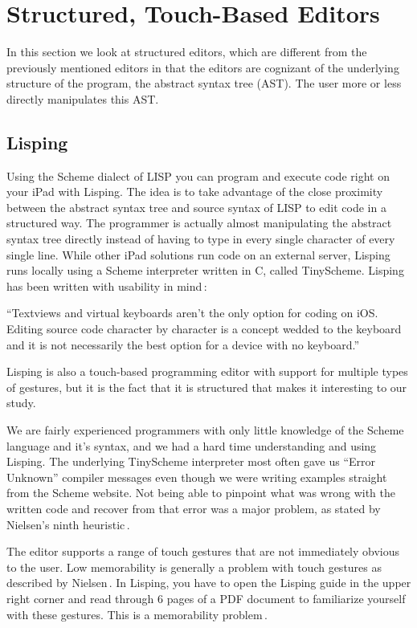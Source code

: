 \section{Structured, Touch-Based Editors}
In this section we look at structured editors, which are different from the previously mentioned editors in that the editors are cognizant of the underlying structure of the program, the abstract syntax tree (AST). The user more or less directly manipulates this AST\@.

\subsection{Lisping}
\label{subsub:Lisping}
Using the Scheme dialect of LISP you can program and execute code right on your iPad with Lisping. The idea is to take advantage of the close proximity between the abstract syntax tree and source syntax of LISP to edit code in a structured way. The programmer is actually almost manipulating the abstract syntax tree directly instead of having to type in every single character of every single line. While other iPad solutions run code on an external server, Lisping runs locally using a Scheme interpreter written in C, called TinyScheme. Lisping has been written with usability in mind\,\cite{lisping}: 

``Textviews and virtual keyboards aren't the only option for coding on iOS\@. Editing source code character by character is a concept wedded to the keyboard and it is not necessarily the best option for a device with no keyboard.''

Lisping is also a touch-based programming editor with support for multiple types of gestures, but it is the fact that it is structured that makes it interesting to our study.

We are fairly experienced programmers with only little knowledge of the Scheme language and it's syntax, and we had a hard time understanding and using Lisping. The underlying TinyScheme interpreter most often gave us “Error Unknown” compiler messages even though we were writing examples straight from the Scheme website. Not being able to pinpoint what was wrong with the written code and recover from that error was a major problem, as stated by Nielsen's ninth heuristic\,\cite{nielsen1990heuristic}.

The editor supports a range of touch gestures that are not immediately obvious to the user. Low memorability is generally a problem with touch gestures as described by Nielsen\,\cite[p. 141]{nielsen2013mobile}. In Lisping, you have to open the Lisping guide in the upper right corner and read through 6 pages of a PDF document to familiarize yourself with these gestures. This is a memorability problem\,\cite{nielsen1990heuristic}.

